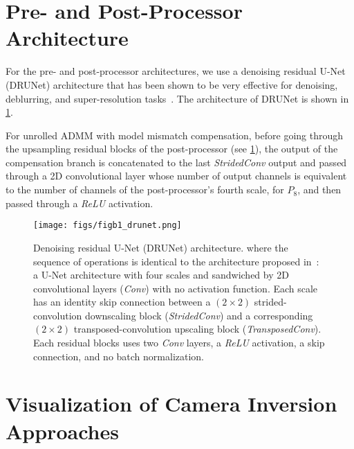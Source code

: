 \section{Pre- and Post-Processor Architecture}
\label{sec:drunet}

\noindent For the pre- and post-processor architectures, we use a denoising residual U-Net (DRUNet) architecture  that has been shown to be very effective for denoising, deblurring, and super-resolution tasks~\cite{zhang2021plug}.
The architecture of DRUNet is shown in \cref{fig:drunet}.

For unrolled ADMM with model mismatch compensation, before going through the upsampling residual blocks of the post-processor (see \cref{fig:drunet}), the output of the compensation branch is concatenated to the last \textit{StridedConv} output and passed through a 2D convolutional layer whose number of output channels is equivalent to the number of channels of the post-processor's fourth scale,  for $P_8$, and then passed through a \textit{ReLU} activation.

\begin{figure}[t!]
	\centering
	\texttt{[image: figs/figb1\_drunet.png]}
	\caption{Denoising residual U-Net (DRUNet) architecture. where the sequence of operations is identical to the architecture proposed in~\cite{zhang2021plug}: a U-Net architecture with four scales and sandwiched by 2D convolutional layers (\textit{Conv}) with no activation function.
		Each scale has an identity skip connection between a $(2\times2)$ strided-convolution downscaling block (\textit{StridedConv}) and a corresponding $(2\times2)$ transposed-convolution upscaling block (\textit{TransposedConv}). Each residual blocks uses two \textit{Conv} layers, a \textit{ReLU} activation, a skip connection, and no batch normalization.}
	\label{fig:drunet}
\end{figure}

\section{Visualization of Camera Inversion Approaches}
\label{app:inversion}

